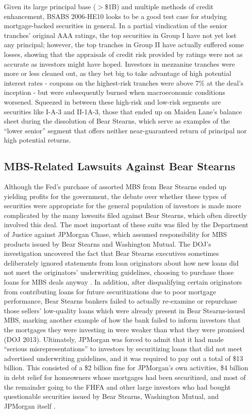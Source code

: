 \documentclass[12pt]{article}
\begin{document}
Given its large principal base ($>$\$1B) and multiple methods of credit enhancement, BSABS 2006-HE10 looks to be a good test case for studying mortgage-backed securities in general. In a partial vindication of the senior tranches’ original AAA ratings, the top securities in Group I have not yet lost any principal; however, the top tranches in Group II have actually suffered some losses, showing that the appraisals of credit risk provided by ratings were not as accurate as investors might have hoped. Investors in mezzanine tranches were more or less cleaned out, as they bet big to take advantage of high potential interest rates - coupons on the highest-risk tranches were above 7\% at the deal’s inception - but were subsequently burned when macroeconomic conditions worsened. Squeezed in between these high-risk and low-risk segments are securities like I-A-3 and II-1A-3, those that ended up on Maiden Lane’s balance sheet during the dissolution of Bear Stearns, which serve as examples of the “lower senior” segment that offers neither near-guaranteed return of principal nor high potential returns.

\subsection*{MBS-Related Lawsuits Against Bear Stearns}

Although the Fed’s purchase of assorted MBS from Bear Stearns ended up yielding profits for the government, the debate over whether these types of securities were appropriate for the general population of investors is made more complicated by the many lawsuits filed against Bear Stearns, which often directly involved this deal. The most important of these suits was filed by the Department of Justice against JPMorgan Chase, which assumed responsibility for MBS products issued by Bear Stearns and Washington Mutual. The DOJ’s investigation uncovered the fact that Bear Stearns executives sometimes deliberately ignored statements from loan originators about how new loans did not meet the originators’ underwriting guidelines, choosing to purchase those loans for MBS deals anyway \parencite{ftc08}. In addition, after disqualifying certain originators from contributing loans for future securitizations due to poor mortgage performance, Bear Stearns bankers failed to actually re-examine or repurchase those sellers’ low-quality loans which were already present in Bear Stearns-issued MBS, marking another example of how the bank failed to inform investors that the mortgages they were investing in were weaker than what they were promised (DOJ 2013). Ultimately, JPMorgan was forced to admit that it had made “serious misrepresentations” to investors by securitizing loans that did not meet advertised underwriting guidelines, and it was required to pay out a total of \$13 billion. This consisted of a \$2 billion fine for JPMorgan’s own activities, \$4 billion in debt relief for homeowners whose mortgages had been securitized, and most of the remainder going to the FHFA and other large investors who had bought questionable securities issued by Bear Stearns, Washington Mutual, and JPMorgan itself \parencite{eavis13}. 
\end{document}
